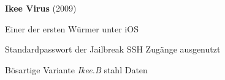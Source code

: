 \begin{frame}
	\centering
	\textbf{Ikee Virus} (2009)
	\begin{block}{}
		Einer der ersten Würmer unter iOS
	\end{block}
	\begin{block}{}
		Standardpasswort der Jailbreak SSH Zugänge ausgenutzt
	\end{block}
	\begin{block}{}
		Bösartige Variante \textsl{Ikee.B} stahl Daten
	\end{block}
\end{frame}